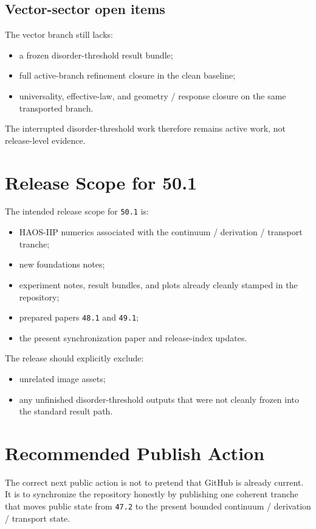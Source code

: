 \documentclass[11pt]{article}
\begin{document}
\subsection{Vector-sector open items}

The vector branch still lacks:
\begin{itemize}
\item a frozen disorder-threshold result bundle;
\item full active-branch refinement closure in the clean baseline;
\item universality, effective-law, and geometry / response closure on the same transported branch.
\end{itemize}

The interrupted disorder-threshold work therefore remains active work, not release-level evidence.

\section{Release Scope for 50.1}

The intended release scope for \texttt{50.1} is:
\begin{itemize}
\item HAOS-IIP numerics associated with the continuum / derivation / transport tranche;
\item new foundations notes;
\item experiment notes, result bundles, and plots already cleanly stamped in the repository;
\item prepared papers \texttt{48.1} and \texttt{49.1};
\item the present synchronization paper and release-index updates.
\end{itemize}

The release should explicitly exclude:
\begin{itemize}
\item unrelated image assets;
\item any unfinished disorder-threshold outputs that were not cleanly frozen into the standard result path.
\end{itemize}

\section{Recommended Publish Action}

The correct next public action is not to pretend that GitHub is already current. It is to synchronize the repository honestly by publishing one coherent tranche that moves public state from \texttt{47.2} to the present bounded continuum / derivation / transport state.
\end{document}
